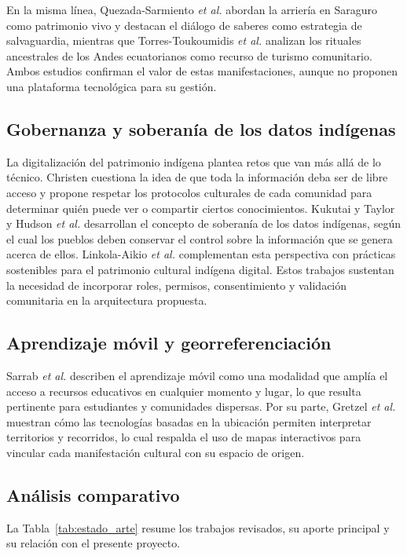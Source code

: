 En la misma línea, Quezada-Sarmiento \textit{et al.} \cite{quezada2026muleteering} abordan la arriería en Saraguro como patrimonio vivo y destacan el diálogo de saberes como estrategia de salvaguardia, mientras que Torres-Toukoumidis \textit{et al.} \cite{torres2022ancestral} analizan los rituales ancestrales de los Andes ecuatorianos como recurso de turismo comunitario. Ambos estudios confirman el valor de estas manifestaciones, aunque no proponen una plataforma tecnológica para su gestión.

\subsection{Gobernanza y soberanía de los datos indígenas}
La digitalización del patrimonio indígena plantea retos que van más allá de lo técnico. Christen \cite{christen2012information} cuestiona la idea de que toda la información deba ser de libre acceso y propone respetar los protocolos culturales de cada comunidad para determinar quién puede ver o compartir ciertos conocimientos. Kukutai y Taylor \cite{kukutai2016indigenous} y Hudson \textit{et al.} \cite{hudson2023indigenous} desarrollan el concepto de soberanía de los datos indígenas, según el cual los pueblos deben conservar el control sobre la información que se genera acerca de ellos. Linkola-Aikio \textit{et al.} \cite{linkola2025digital} complementan esta perspectiva con prácticas sostenibles para el patrimonio cultural indígena digital. Estos trabajos sustentan la necesidad de incorporar roles, permisos, consentimiento y validación comunitaria en la arquitectura propuesta.

\subsection{Aprendizaje móvil y georreferenciación}
Sarrab \textit{et al.} \cite{sarrab2012mobile} describen el aprendizaje móvil como una modalidad que amplía el acceso a recursos educativos en cualquier momento y lugar, lo que resulta pertinente para estudiantes y comunidades dispersas. Por su parte, Gretzel \textit{et al.} \cite{gretzel2015smart} muestran cómo las tecnologías basadas en la ubicación permiten interpretar territorios y recorridos, lo cual respalda el uso de mapas interactivos para vincular cada manifestación cultural con su espacio de origen.

\subsection{Análisis comparativo}
La Tabla~\ref{tab:estado_arte} resume los trabajos revisados, su aporte principal y su relación con el presente proyecto.

